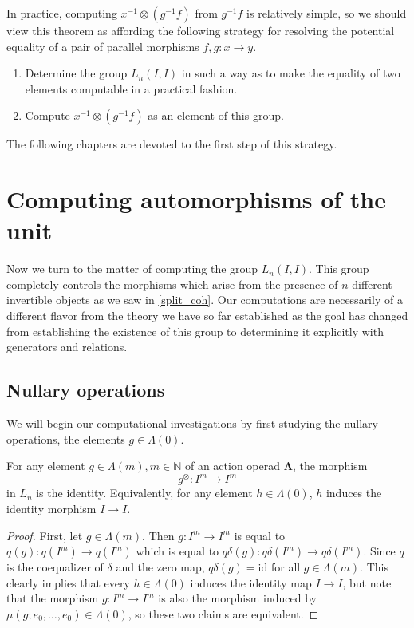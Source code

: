\documentclass{amsbook} %
\newcommand{\id}{\textrm{id}}
\newcommand{\ML}{\mathbf{\Lambda}}
\numberwithin{section}{chapter}
\begin{document}
In practice, computing $x^{-1} \otimes (g^{-1} f)$ from $g^{-1} f$ is relatively simple, so we should view this theorem as affording the following strategy for resolving the potential equality of a pair of parallel morphisms $f, g:x \to y$.
\begin{enumerate}
\item Determine the group $L_n(I,I)$ in such a way as to make the equality of two elements computable in a practical fashion.
\item Compute $x^{-1} \otimes (g^{-1} f)$ as an element of this group.
\end{enumerate}
The following chapters are devoted to the first step of this strategy.

\chapter{Computing automorphisms of the unit}

Now we turn to the matter of computing the group $L_n(I,I)$. This group completely controls the morphisms which arise from the presence of $n$ different invertible objects as we saw in \cref{split_coh}. Our computations are necessarily of a different flavor from the theory we have so far established as the goal has changed from establishing the existence of this group to determining it explicitly with generators and relations.

\section{Nullary operations}
We will begin our computational investigations by first studying the nullary operations, the elements $g \in \Lambda(0)$.

\begin{lem} \label{noscalar} For any element $g \in \Lambda(m), m \in \mathbb{N}$ of an action operad $\ML$, the morphism
\[
g^{\otimes}: I^m \to I^m
\]
in $L_n$ is the identity.
Equivalently, for any element $h \in \Lambda(0)$, $h$ induces the identity morphism $I \to I$.
\end{lem}
\begin{proof}
First, let $g \in \Lambda(m)$. Then $g: I^m \to I^m$ is equal to $q(g):q(I^m) \to q(I^m)$ which is equal to $q\delta(g): q\delta(I^m) \to q\delta(I^m)$. Since $q$ is the coequalizer of $\delta$ and the zero map, $q\delta(g) = \id$ for all $g \in \Lambda(m)$. This clearly implies that every $h \in \Lambda(0)$ induces the identity map $I \to I$, but note that the morphism $g:I^m \to I^m$ is also the morphism induced by $\mu(g; e_0, \ldots, e_0) \in \Lambda(0)$, so these two claims are equivalent.
\end{proof}
\end{document}
